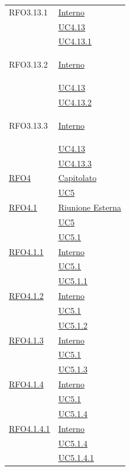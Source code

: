\begin{itemize}
\begin{itemize}
\begin{itemize}
\begin{itemize}
\begin{longtable}{|>{\centering}m{5cm}|m{5cm}<{\centering}|}
\hypertarget{RFO3.13.1}{RFO3.13.1} & \hyperlink{Interno}{Interno}\\
&\hyperref[UC4.13]{UC4.13}\\
&\hyperref[UC4.13.1]{UC4.13.1}\\ \hline

\hypertarget{RFO3.13.2}{RFO3.13.2} & \hyperlink{Interno}{Interno}\\
&\hyperref[UC4.13]{UC4.13}\\
&\hyperref[UC4.13.2]{UC4.13.2}\\ \hline

\hypertarget{RFO3.13.3}{RFO3.13.3} & \hyperlink{Interno}{Interno}\\
&\hyperref[UC4.13]{UC4.13}\\
&\hyperref[UC4.13.3]{UC4.13.3}\\ \hline

\hyperlink{RFO4}{RFO4} & \hyperlink{Capitolato}{Capitolato}\\
& \hyperref[UC5]{UC5}\\ \hline

\hyperlink{RFO4.1}{RFO4.1} & \hyperlink{Riunione Esterna}{Riunione Esterna}\\
& \hyperref[UC5]{UC5}\\
& \hyperref[UC5.1]{UC5.1}\\ \hline

\hyperlink{RFO4.1.1}{RFO4.1.1} & \hyperlink{Interno}{Interno}\\
& \hyperref[UC5.1]{UC5.1}\\
& \hyperref[UC5.1.1]{UC5.1.1}\\ \hline

\hyperlink{RFO4.1.2}{RFO4.1.2} & \hyperlink{Interno}{Interno}\\
& \hyperref[UC5.1]{UC5.1}\\
& \hyperref[UC5.1.2]{UC5.1.2}\\ \hline

\hyperlink{RFO4.1.3}{RFO4.1.3} & \hyperlink{Interno}{Interno}\\
& \hyperref[UC5.1]{UC5.1}\\
& \hyperref[UC5.1.3]{UC5.1.3}\\ \hline

\hyperlink{RFO4.1.4}{RFO4.1.4} & \hyperlink{Interno}{Interno}\\
& \hyperref[UC5.1]{UC5.1}\\
& \hyperref[UC5.1.4]{UC5.1.4}\\ \hline

\hyperlink{RFO4.1.4.1}{RFO4.1.4.1} & \hyperlink{Interno}{Interno}\\
& \hyperref[UC5.1.4]{UC5.1.4}\\
& \hyperref[UC5.1.4.1]{UC5.1.4.1}\\ \hline


\end{longtable}
\end{itemize}
\end{itemize}
\end{itemize}
\end{itemize}
